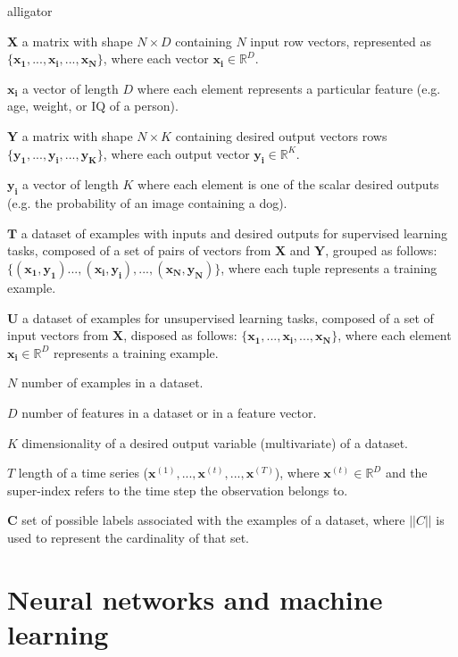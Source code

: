\begin{labeling}{alligator}
	\item [$\mathbf{X}$] a matrix with shape $N \times D$ containing $N$ input row vectors, represented as $\{\mathbf{x_1},...,\mathbf{x_i},...,\mathbf{x_N}\}$, where each vector $\mathbf{x_i} \in \mathbb{R}^D$.
	\item [$\mathbf{x_i}$] a vector of length $D$ where each element represents a particular feature (e.g. age, weight, or IQ of a person).
	\item [$\mathbf{Y}$] a matrix with shape $N \times K$ containing desired output vectors rows $\{\mathbf{y_1},...,\mathbf{y_i},...,\mathbf{y_K}\}$, where each output vector $\mathbf{y_i} \in \mathbb{R}^K$.
	\item [$\mathbf{y_i}$]  a vector of length $K$ where each element is one of the scalar desired outputs (e.g. the probability of an image containing a dog).
	\item [$\mathbf{T}$] a dataset  of examples with inputs and desired outputs for supervised learning tasks, composed of a set of pairs of vectors from $\mathbf{X}$ and $\mathbf{Y}$, grouped as follows: $\{(\mathbf{x_1}, \mathbf{y_1})...,(\mathbf{x_i}, \mathbf{y_i}),...,(\mathbf{x_N}, \mathbf{y_N})\}$, where each tuple represents a training example.
	\item [$\mathbf{U}$] a dataset of examples for unsupervised learning tasks, composed of a set of input vectors from $\mathbf{X}$, disposed as follows: $\{\mathbf{x_1},...,\mathbf{x_i},...,\mathbf{x_N}\}$, where each element $\mathbf{x_i} \in \mathbb{R}^D$ represents a training example.
	\item [$N$] number of examples in a dataset.
	\item [$D$]  number of features in a dataset or in a feature vector.
	\item [$K$] dimensionality of a desired output variable (multivariate) of a dataset.
	\item [$T$] length of a time series ($\mathbf{x}^{(1)}, ..., \mathbf{x}^{(t)}, ..., \mathbf{x}^{(T)}$), where $\mathbf{x}^{(t)} \in \mathbb{R}^D$ and the super-index refers to the time step the observation belongs to.
	\item [$\mathbf{C}$] set of possible labels associated with the examples of a dataset, where $||C||$ is used to represent the cardinality of that set.
\end{labeling}

\section*{Neural networks and machine learning}

